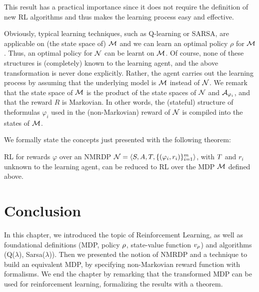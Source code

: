 This result has a practical importance since it does not require the
definition of new RL algorithms and thus makes the learning
process easy and effective.

Obviously, typical learning techniques, such as Q-learning or SARSA, are applicable on (the state space of) $\mathcal{M}$ and we can learn an optimal policy $\rho$ for $\mathcal{M}$. Thus, an optimal policy for $\mathcal{N}$ can be learnt on $\mathcal{M}$. Of course, none of these structures is (completely) known to the learning agent, and the above transformation is never done explicitly. Rather, the agent carries out the learning process by assuming that the underlying model is $\mathcal{M}$ instead of $\mathcal{N}$. We remark that the state space of $\mathcal{M}$ is the product of the state spaces of $\mathcal{N}$ and $\mathcal{A}_{\varphi_i}$, and that the reward $R$ is Markovian. In other words, the (stateful) structure of the\LLf formulas $\varphi_i$ used in the (non-Markovian) reward of $\mathcal{N}$ is compiled into the states of $\mathcal{M}$.

We formally state the concepts just presented with the following theorem:

\begin{theorem}\label{th:rl-for-llf-rewards}
RL for \LLf rewards $\varphi$ over an NMRDP
$\mathcal{N} = \langle S, A, T, \{(\varphi_i, r_i)\}^m_{i=1} \rangle$, with $T$ and $r_i$ unknown to
the learning agent, can be reduced to RL over the MDP $\mathcal{M}$
defined above.
\end{theorem}

\section{Conclusion}
In this chapter, we introduced the topic of Reinforcement Learning, as well as foundational definitions (MDP, policy $\rho$, state-value function $v_\rho$) and algorithms (Q($\lambda$), Sarsa($\lambda$)). Then we presented the notion of NMRDP and a technique to build an equivalent MDP, by specifying non-Markovian reward function with \LLf formalisms. We end the chapter by remarking that the transformed MDP can be used for reinforcement learning, formalizing the results with a theorem.
\endinput

